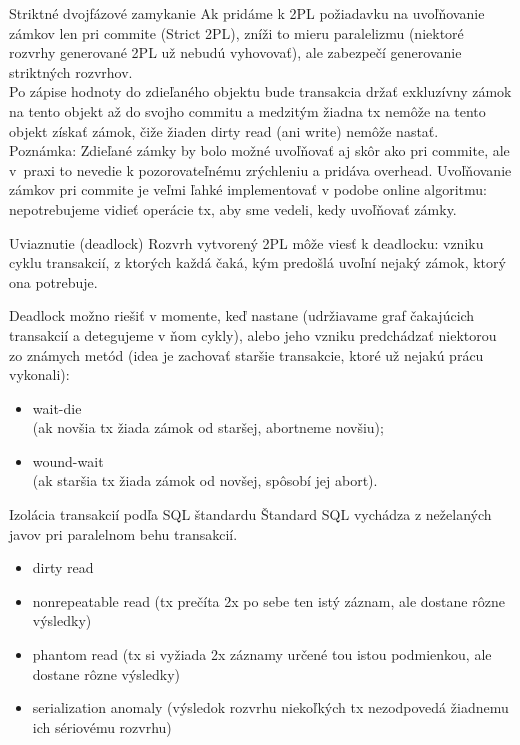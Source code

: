 \documentclass[12pt]{beamer}
\def\blue#1{\textcolor{Cerulean}{#1}}
\begin{document}
\begin{frame}[fragile]{Striktné dvojfázové zamykanie}
Ak pridáme k 2PL požiadavku na uvoľňovanie zámkov len pri commite (Strict 2PL), zníži to mieru paralelizmu
(niektoré rozvrhy generované 2PL už nebudú vyhovovať), ale zabezpečí generovanie striktných rozvrhov.\\[2mm]

Po zápise hodnoty do zdieľaného objektu bude transakcia držať exkluzívny zámok na tento objekt až do svojho commitu
a medzitým žiadna tx nemôže na tento objekt získať zámok, čiže žiaden dirty read (ani write) nemôže nastať.\\[2mm]

\scriptsize{Poznámka: Zdieľané zámky by bolo možné uvoľňovať aj skôr ako pri commite,
ale v~praxi to nevedie k pozorovateľnému zrýchleniu a pridáva overhead.
Uvoľňovanie zámkov pri commite je veľmi ľahké implementovať v podobe online algoritmu:
nepotrebujeme vidieť  operácie tx, aby sme vedeli, kedy uvoľňovať zámky.}
\end{frame}

\begin{frame}[fragile]{Uviaznutie (deadlock)}
Rozvrh vytvorený 2PL môže viesť k \alert{deadlocku}:
vzniku cyklu transakcií, z ktorých každá čaká, kým predošlá uvoľní nejaký zámok, ktorý ona potrebuje.

Deadlock možno riešiť v momente, keď nastane (udržiavame graf čakajúcich transakcií a detegujeme v ňom cykly),
alebo jeho vzniku predchádzať niektorou zo známych metód
(idea je zachovať staršie transakcie, ktoré už nejakú prácu vykonali):
\begin{itemize}
\item \blue{wait-die}\\ (ak novšia tx žiada zámok od staršej, abortneme novšiu);
\item \blue{wound-wait}\\ (ak staršia tx žiada zámok od novšej, spôsobí jej abort).
\end{itemize}
\end{frame}



\begin{frame}[fragile]{Izolácia transakcií podľa SQL štandardu}
Štandard SQL vychádza z neželaných javov pri paralelnom behu transakcií.
\begin{itemize}
\item \alert{dirty read}
\item \alert{nonrepeatable read} (tx prečíta 2x po sebe ten istý záznam, ale dostane rôzne výsledky)
\item \alert{phantom read} (tx si vyžiada 2x záznamy určené tou istou podmienkou, ale dostane rôzne výsledky)
\item \alert{serialization anomaly} (výsledok rozvrhu niekoľkých tx nezodpovedá žiadnemu ich sériovému rozvrhu)
\end{itemize}
\end{frame}
\end{document}
